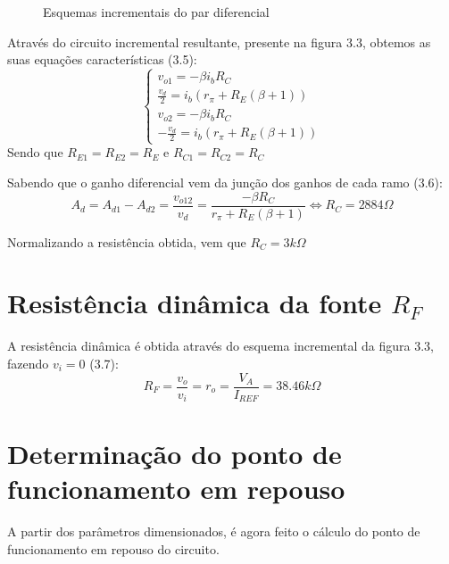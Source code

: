\documentclass[a4paper,2pt]{report}
\begin{document}
\begin{figure}%
    \centering
    \qquad
    \caption{Esquemas incrementais do par diferencial}%
    \label{fig:example}%
\end{figure}


\par Através do circuito incremental resultante, presente na figura 3.3, obtemos as suas equações características (3.5):
\begin{equation}
    \begin{cases}
        v_{o1} = -\beta i_b R_C \\
        \frac{v_d}{2} = i_b(r_\pi + R_E(\beta+1)) \\
        v_{o2} = -\beta i_b R_C \\
        -\frac{v_d}{2} = i_b(r_\pi + R_E(\beta+1)) 
    \end{cases}
\end{equation}
Sendo que \(R_{E1} = R_{E2} = R_E\) e \(R_{C1} = R_{C2} = R_C\)

\par Sabendo que o ganho diferencial vem da junção dos ganhos de cada ramo (3.6):
\begin{equation}
    A_d = A_{d1} - A_{d2} = \frac{v_{o12}}{v_d} = \frac{-\beta R_C}{r_\pi + R_E(\beta + 1)} \Leftrightarrow R_C = 2884 \Omega
\end{equation}

\par Normalizando a resistência obtida, vem que \(R_C = 3k\Omega\)

\section{Resistência dinâmica da fonte \(R_F\)}
\par A resistência dinâmica é obtida através do esquema incremental da figura 3.3, fazendo \(v_i = 0\) (3.7):
\begin{equation}
    R_F = \frac{v_o}{v_i} = r_{o} = \frac{V_A}{I_{REF}} = 38.46k\Omega
\end{equation}

\section{Determinação do ponto de funcionamento em repouso}
\par A partir dos parâmetros dimensionados, é agora feito o cálculo do ponto de funcionamento em repouso do circuito.
\end{document}
